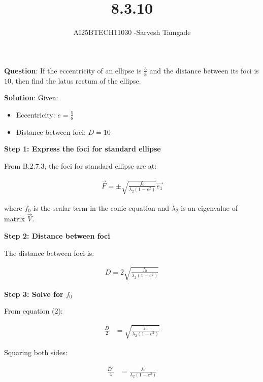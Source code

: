 \documentclass[journal]{IEEEtran}
\begin{document}

\vspace{3cm}

\title{8.3.10}
\author{AI25BTECH11030 -Sarvesh Tamgade}
{\let\newpage\relax\maketitle}

\renewcommand{\thefigure}{\theenumi}
\renewcommand{\thetable}{\theenumi}
\setlength{\intextsep}{10pt} 


\renewcommand{\thetable}{\theenumi}


\textbf{Question}:
If the eccentricity of an ellipse is $\frac{5}{8}$ and the distance between its foci is $10$, then find the latus rectum of the ellipse.


\textbf{Solution}:  
Given:
\begin{itemize}
\item Eccentricity: $e = \frac{5}{8}$
\item Distance between foci: $D = 10$
\end{itemize}

\textbf{Step 1: Express the foci for standard ellipse}

From B.2.7.3, the foci for standard ellipse are at:

\begin{align}
\vec{F} = \pm\sqrt{\frac{f_0}{\lambda_2(1-e^2)}} \vec{e_1}
\end{align}

where $f_0$ is the scalar term in the conic equation and $\lambda_2$ is an eigenvalue of matrix $\vec{V}$.

\textbf{Step 2: Distance between foci}

The distance between foci is:

\begin{align}
D = 2\sqrt{\frac{f_0}{\lambda_2(1-e^2)}}
\end{align}

\textbf{Step 3: Solve for $f_0$}

From equation (2):

\begin{align}
\frac{D}{2} &= \sqrt{\frac{f_0}{\lambda_2(1-e^2)}}
\end{align}

Squaring both sides:

\begin{align}
\frac{D^2}{4} &= \frac{f_0}{\lambda_2(1-e^2)}
\end{align}
\end{document}
